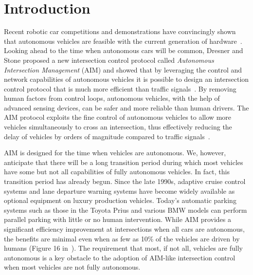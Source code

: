 \section{Introduction}
\label{sec:introduction}

Recent robotic car competitions and demonstrations have convincingly
shown that autonomous vehicles are feasible with the current
generation of hardware~\cite{mybib:Darpa07Urban}. Looking ahead to the
time when autonomous cars will be common, Dresner and Stone proposed a
new intersection control protocol called \emph{Autonomous Intersection
Management} (AIM) and showed that by leveraging the control and
network capabilities of autonomous vehicles it is possible to design
an intersection control protocol that is much more efficient than
traffic signals~\cite{bib:Dresner08Multiagent}.  By removing human
factors from control loops, autonomous vehicles, with the help of
advanced sensing devices, can be safer and more reliable than human
drivers.  The AIM protocol exploits the fine control of autonomous
vehicles to allow more vehicles simultaneously to cross an
intersection, thus effectively reducing the delay of vehicles by
orders of magnitude compared to traffic
signals~\cite{bib:Fajardo12Automated}.

AIM is designed for the time when vehicles are autonomous.  We,
however, anticipate that there will be a long transition period during
which most vehicles have some but not all capabilities of fully
autonomous vehicles.  In fact, this transition period has already
begun. Since the late 1990s, adaptive cruise control systems and lane
departure warning systems have become widely available as optional
equipment on luxury production vehicles.  Today's automatic parking
systems such as those in the Toyota Prius and various BMW models can
perform parallel parking with little or no human intervention.  While
AIM provides a significant efficiency improvement at intersections
when all cars are autonomous, the benefits are minimal even when as
few as 10\% of the vehicles are driven by humans (Figure 16
in~\cite{bib:Dresner08Multiagent}).  The requirement that most,
if not all,
vehicles are fully autonomous is a key obstacle to the adoption
of AIM-like intersection control when most vehicles are not fully autonomous.

